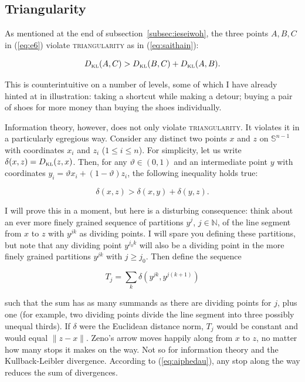 \documentclass[phd,12pt,oneside]{ubcthesis}
\begin{document}

\subsection{Triangularity}
\label{subsec:triangularity}

As mentioned at the end of subsection~\ref{subsec:ieseiwoh}, the three
points $A,B,C$ in (\ref{eq:e6}) violate \textsc{triangularity} as in
(\ref{eq:saithain}):

\begin{equation}
  \label{eq:yohliimo}
  D_{\mbox{\tiny KL}}(A,C)>D_{\mbox{\tiny KL}}(B,C)+D_{\mbox{\tiny KL}}(A,B).
\end{equation}

{\noindent}This is counterintuitive on a number of levels, some of which I have
already hinted at in illustration: taking a shortcut while making a
detour; buying a pair of shoes for more money than buying the shoes
individually. 

Information theory, however, does not only violate
\textsc{triangularity}. It violates it in a particularly egregious
way. Consider any distinct two points $x$ and $z$ on
$\mathbb{S}^{n-1}$ with coordinates $x_{i}$ and $z_{i}$
($1\leq{}i\leq{}n$). For simplicity, let us write
$\delta(x,z)=D_{\mbox{\tiny KL}}(z,x)$. Then, for any
$\vartheta\in{}(0,1)$ and an intermediate point $y$ with coordinates
$y_{i}=\vartheta{}x_{i}+(1-\vartheta)z_{i}$, the following inequality
holds true:

\begin{equation}
  \label{eq:aiphedau}
  \delta(x,z)>\delta\left(x,y\right)+\delta\left(y,z\right).
\end{equation}

{\noindent}I will prove this in a moment, but here is a disturbing consequence:
think about an ever more finely grained sequence of partitions
$y^{j}$, $j\in\mathbb{N}$, of the line segment from $x$ to $z$ with
$y^{jk}$ as dividing points. I will spare you defining these
partitions, but note that any dividing point $y^{j_{0}k}$ will also be a
dividing point in the more finely grained partitions $y^{jk}$ with
$j\geq{}j_{0}$. Then define the sequence

\begin{equation}
  \label{eq:queireiw}
  T_{j}=\sum_{k}\delta\left(y^{jk},y^{j(k+1)}\right)
\end{equation}

{\noindent}such that the sum has as many summands as there are dividing points
for $j$, plus one (for example, two dividing points divide the line
segment into three possibly unequal thirds). If $\delta$ were the
Euclidean distance norm, $T_{j}$ would be constant and would equal
$\|z-x\|$. Zeno's arrow moves happily along from $x$ to $z$, no matter
how many stops it makes on the way. Not so for information theory and
the Kullback-Leibler divergence. According to (\ref{eq:aiphedau}), any
stop along the way reduces the sum of divergences.
\end{document}
